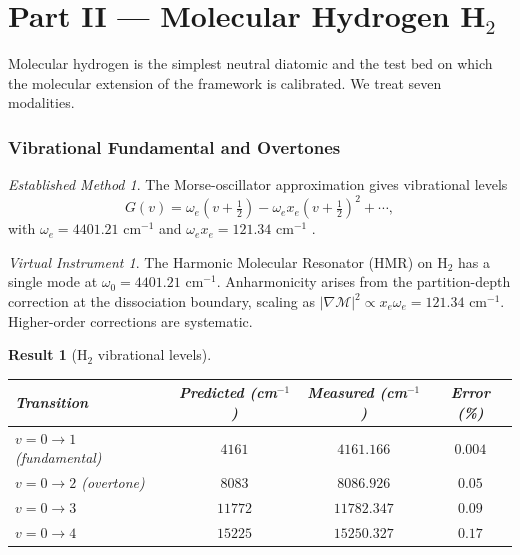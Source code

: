 \documentclass[twocolumn,11pt,a4paper]{article}
\theoremstyle{stmtstyle}
\newtheorem{result}{Result}
\theoremstyle{definition}
\theoremstyle{remark}
\newtheorem*{instrument}{Virtual Instrument}
\newtheorem*{established}{Established Method}
\newcommand{\Depth}{\mathcal{M}}
\begin{document}
\part*{Part II --- Molecular Hydrogen H$_{2}$}

Molecular hydrogen is the simplest neutral diatomic and the test bed on which the molecular extension of the framework is calibrated. We treat seven modalities.

\section{Vibrational Fundamental and Overtones}
\label{sec:h2vib}

\begin{established}
The Morse-oscillator approximation \citep{wilsondeciuscross1955} gives vibrational levels
\begin{equation}
G(v)=\omega_{e}(v+\tfrac{1}{2})-\omega_{e}x_{e}(v+\tfrac{1}{2})^{2}+\cdots,
\end{equation}
with $\omega_{e}=4401.21$ cm$^{-1}$ and $\omega_{e}x_{e}=121.34$ cm$^{-1}$ \citep{huberHerzberg1979}.
\end{established}

\begin{instrument}
The Harmonic Molecular Resonator (HMR) on H$_{2}$ has a single mode at $\omega_{0}=4401.21$ cm$^{-1}$. Anharmonicity arises from the partition-depth correction at the dissociation boundary, scaling as $|\nabla\Depth|^{2}\propto x_{e}\omega_{e}=121.34$ cm$^{-1}$. Higher-order corrections are systematic.
\end{instrument}

\begin{result}[H$_{2}$ vibrational levels]\label{res:h2vib}
\begin{center}\small
\begin{tabular}{lccc}
\toprule
Transition & Predicted (cm$^{-1}$) & Measured (cm$^{-1}$) & Error (\%)\\
\midrule
$v=0\to 1$ (fundamental) & $4161$ & $4161.166$ & $0.004$\\
$v=0\to 2$ (overtone)    & $8083$ & $8086.926$ & $0.05$\\
$v=0\to 3$               & $11772$& $11782.347$& $0.09$\\
$v=0\to 4$               & $15225$& $15250.327$& $0.17$\\
\bottomrule
\end{tabular}
\end{center}
\end{result}
\end{document}

